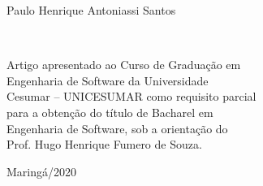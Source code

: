 \begin{center}
    \makeatletter
    Paulo Henrique Antoniassi Santos
    \par
    
    \vspace{3cm}
    \Large
    \textbf{ \@title} \\
    \normalsize
\end{center}
\begin{flushright}
    \vspace{2cm}
    Artigo apresentado ao Curso de Graduação em \\
    Engenharia de Software da Universidade\\
    Cesumar – UNICESUMAR como requisito parcial\\
    para a obtenção do título de Bacharel em\\
    Engenharia de Software, sob a orientação do\\
    Prof. Hugo Henrique Fumero de Souza.
\end{flushright}
\begin{center}
    \vspace{5cm}
    Maringá/2020
\end{center}
\normalsize
\makeatother
\newpage


